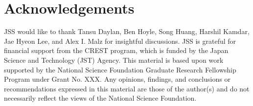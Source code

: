 \documentclass[a4paper,fleqn,usenatbib,english]{mnras}
\begin{document}
\section*{Acknowledgements}

JSS would like to thank Tansu Daylan, Ben Hoyle, Song Huang, Harshil Kamdar, Jae Hyeon Lee, and Alex I. Malz for insightful discussions. JSS is grateful for financial support from the CREST program, which is funded by the Japan Science and Technology (JST) Agency. This material is based upon work supported by the National Science Foundation Graduate Research Fellowship Program under Grant No. XXX. Any opinions, findings, and conclusions or recommendations expressed in this material are those of the author(s) and do not necessarily reflect the views of the National Science Foundation.






\bsp	%
\label{lastpage}
\end{document}
